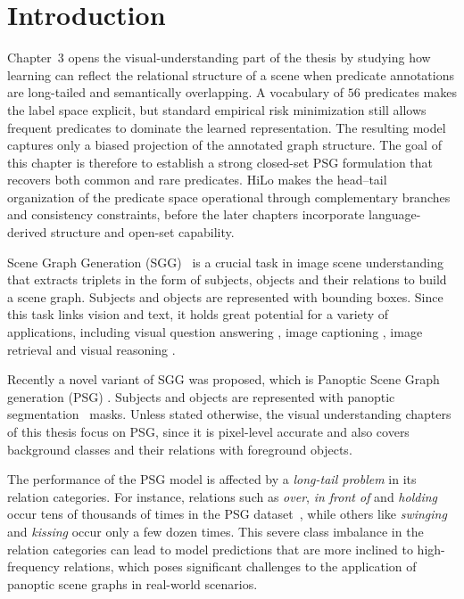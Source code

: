 \section{Introduction}
\label{hilo:sec:introduction}

Chapter~3 opens the visual-understanding part of the thesis by studying how learning can reflect the relational structure of a scene when predicate annotations are long-tailed and semantically overlapping. A vocabulary of $56$ predicates makes the label space explicit, but standard empirical risk minimization still allows frequent predicates to dominate the learned representation. The resulting model captures only a biased projection of the annotated graph structure.
The goal of this chapter is therefore to establish a strong closed-set PSG formulation that recovers both common and rare predicates. HiLo makes the head--tail organization of the predicate space operational through complementary branches and consistency constraints, before the later chapters incorporate language-derived structure and open-set capability.

Scene Graph Generation (SGG)~\citep{lu2016visual} is a crucial task in image scene understanding that extracts triplets in the form of subjects, objects and their relations to build a scene graph. 
Subjects and objects are represented with bounding boxes.
Since this task links vision and text, it holds great potential for a variety of applications, including visual question answering \citep{hildebrandt2020scene}, image captioning \citep{gao2018image, chen2020say}, image retrieval \citep{johnson2015image, schuster2015generating, qi2017online} and visual reasoning \citep{aditya2018image, shi2019explainable}.

Recently a novel variant of SGG was proposed, which is Panoptic Scene Graph generation (PSG) \citep{yang2022panoptic}.
Subjects and objects are represented with panoptic segmentation~\citep{kirillov2019panoptic} masks. Unless stated otherwise, the visual understanding chapters of this thesis focus on PSG, since it is pixel-level accurate and also covers background classes and their relations with foreground objects.

The performance of the PSG model is affected by a \emph{long-tail problem} in its relation categories.
For instance, relations such as \textit{over}, \textit{in front of} and \textit{holding} occur tens of thousands of times in the PSG dataset~\citep{yang2022panoptic}, while others like \textit{swinging} and \textit{kissing} occur only a few dozen times.
This severe class imbalance in the relation categories can lead to model predictions that are more inclined to high-frequency relations, which poses significant challenges to the application of panoptic scene graphs in real-world scenarios.

